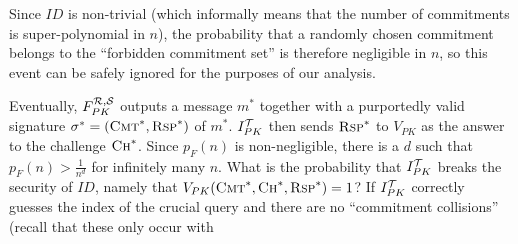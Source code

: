 Since $ID$ is non-trivial (which informally means that the number of
commitments is super-polynomial in $n$), the probability that a randomly
chosen commitment belongs to the ``forbidden commitment set'' is therefore
negligible in $n$, so this event can be safely ignored for the purposes of our
analysis. 

Eventually, $F_{PK}^{\mathcal{R},\mathcal{S}}$ outputs a message $m^*$ together with a
purportedly valid signature $\sigma^* = (\textsc{Cmt}^*,\textsc{Rsp}^*)$ of
$m^*$. $I^{\mathcal{T}}_{PK}$ then sends $\textsc{Rsp}^*$ to $V_{PK}$ as the answer to
the challenge $\textsc{Ch}^*$.
Since $p_F(n)$ is non-negligible, 
there is a $d$ such that
$p_F(n) > \frac{1}{n^d}$ for infinitely many $n$.
What is the probability that $I_{PK}^{\mathcal{T}}$ breaks the security of $ID$,
namely that $V_{PK}(\textsc{Cmt}^*,\textsc{Ch}^*,\textsc{Rsp}^*) = 1$?
If $I_{PK}^{\mathcal{T}}$ correctly guesses the index of the crucial query 
and there are no ``commitment collisions'' (recall that these only occur with

